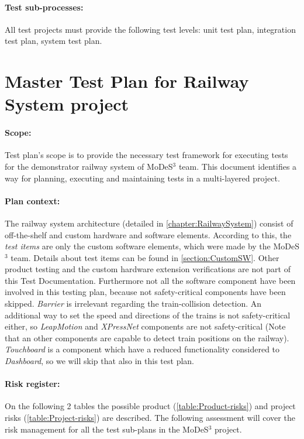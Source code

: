 \paragraph{Test sub-processes:} All test projects must provide the following test levels: unit test plan, integration test plan, system test plan.

\section{Master Test Plan for Railway System project}\label{section:MTP}
\paragraph{Scope:} Test plan's scope is to provide the necessary test framework for executing tests for the demonstrator railway system of MoDeS$^3$ team. This document identifies a way for planning, executing and maintaining tests in a multi-layered project.
\paragraph{Plan context:} The railway system architecture (detailed in \autoref{chapter:RailwaySystem}) consist of off-the-shelf and custom hardware and software elements. According to this, the \textit{test items} are only the custom software elements, which were made by the MoDeS$^3$ team. Details about test items can be found in \autoref{section:CustomSW}. Other product testing and the custom hardware extension verifications are not part of this Test Documentation. Furthermore not all the software component have been involved in this testing plan, because not safety-critical components have been skipped. \textit{Barrier} is irrelevant regarding the train-collision detection. An additional way to set the speed and directions of the trains is not safety-critical either, so \textit{LeapMotion} and \textit{XPressNet} components are not safety-critical (Note that an other components are capable to detect train positions on the railway). \textit{Touchboard} is a component which have a reduced functionality considered to \textit{Dashboard}, so we will skip that also in this test plan.
\paragraph{Risk register:} On the following 2 tables the possible product (\autoref{table:Product-risks}) and project risks (\autoref{table:Project-risks}) are described. The following assessment will cover the risk management for all the test sub-plans in the MoDeS$^3$ project.

